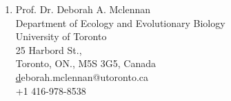 \documentclass[11pt]{article}
\begin{document}
\begin{enumerate}
\item Prof. Dr. Deborah A. Mclennan\\
Department of Ecology and Evolutionary Biology\\
University of Toronto\\
25 Harbord St.,\\
Toronto, ON., M5S 3G5, Canada \\
\href{deborah.mclennan@utoronto.ca}deborah.mclennan@utoronto.ca
\\+1 416-978-8538



\end{enumerate}









\end{document}
